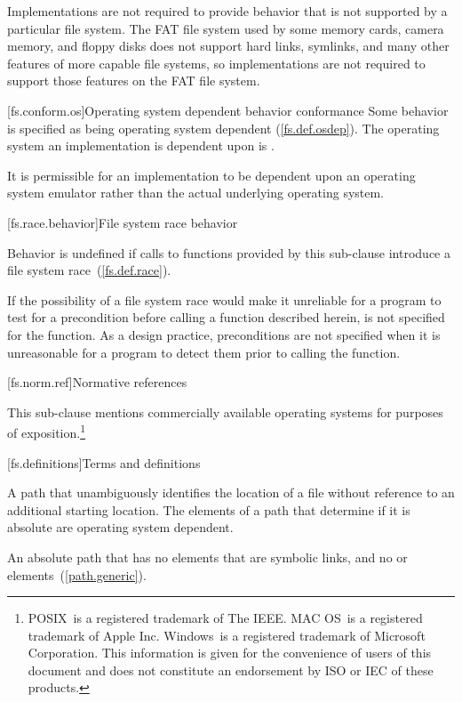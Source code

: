 \pnum
Implementations are not required to provide behavior that is not supported by
a particular file system.
\enterexample The FAT file system used by some memory cards, camera memory, and
floppy disks does not support hard links, symlinks, and many other features of
more capable file systems, so implementations are not required to support those
features on the FAT file system. \exitexample

[fs.conform.os]{Operating system dependent behavior conformance}
\pnum
Some behavior is specified as being
operating system dependent (\ref{fs.def.osdep}). The operating system an
implementation is dependent upon is
.

\pnum
It is permissible for an implementation to be dependent upon an operating
system emulator rather than the actual underlying operating system.

[fs.race.behavior]{File system race behavior}

\pnum
Behavior is undefined if calls to functions provided by this sub-clause introduce a file system race~(\ref{fs.def.race}).

\pnum
If the possibility of a file system race would make it unreliable for a
program to test for a precondition before calling a function described herein,
\requires is not specified for the function.
\enternote As a design practice, preconditions are not specified when it
is unreasonable for a program to detect them prior to calling the function.
\exitnote

[fs.norm.ref]{Normative references}

\pnum
This sub-clause mentions commercially
available operating systems for purposes of exposition.\footnote{
POSIX\textregistered\ is a registered trademark of The IEEE.
MAC OS\textregistered\ is a registered trademark of Apple Inc.
Windows\textregistered\ is a registered trademark of Microsoft Corporation.
This information is given for the convenience of users of this document and
does not constitute an endorsement by ISO or IEC of these
products.
}

[fs.definitions]{Terms and definitions}

A path that unambiguously
identifies the location of a file without reference to an additional starting
location. The elements of a path that determine if it is absolute are
operating system dependent.

An absolute path that has no elements that are symbolic links, and no  or
 elements~(\ref{path.generic}).

